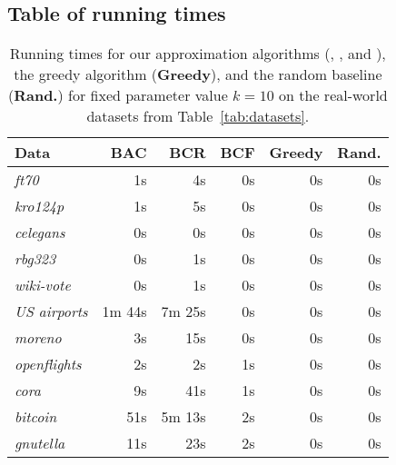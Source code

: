 \subsection{Table of running times}

\begin{table}[H] \centering
\caption{Running times for our approximation algorithms (\textbf{\algbac{}}, \textbf{\algbacb{}}, and \textbf{\algbacf{}}), the greedy algorithm (\textbf{Greedy}), and the random baseline (\textbf{Rand.}) for fixed parameter value $k=10$ on the real-world datasets from Table~\ref{tab:datasets}.}
\label{tab:running_times}
\begin{tabular}{@{}lrrrrr@{}}\toprule
Data & BAC & BCR & BCF & Greedy & Rand. \\
\midrule
\emph{ft70} & 1s & 4s & 0s & 0s & 0s \\
\emph{kro124p} & 1s & 5s & 0s & 0s & 0s \\
\emph{celegans} & 0s & 0s & 0s & 0s & 0s \\
\emph{rbg323} & 0s & 1s & 0s & 0s & 0s \\
\emph{wiki-vote} & 0s & 1s & 0s & 0s & 0s \\
\emph{US airports} & 1m 44s & 7m 25s & 0s & 0s & 0s \\
\emph{moreno} & 3s & 15s & 0s & 0s & 0s \\
\emph{openflights} & 2s & 2s & 1s & 0s & 0s \\
\emph{cora} & 9s & 41s & 1s & 0s & 0s \\
\emph{bitcoin} & 51s & 5m 13s & 2s & 0s & 0s \\
\emph{gnutella} & 11s & 23s & 2s & 0s & 0s \\
\bottomrule
\end{tabular}
\end{table}